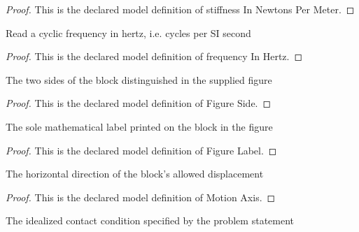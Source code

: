 \begin{proof}
  This is the declared model definition of stiffness In Newtons Per Meter.
\end{proof}
\begin{definition}
  \label{def:physics:phyx-mini-0252:phyxminiproblems-problemphyxmini0252-frequencyinhertz}
  Read a cyclic frequency in hertz, i.e. cycles per SI second
\end{definition}
\begin{proof}
  This is the declared model definition of frequency In Hertz.
\end{proof}
\begin{definition}
  \label{def:physics:phyx-mini-0252:phyxminiproblems-problemphyxmini0252-figureside}
  The two sides of the block distinguished in the supplied figure
\end{definition}
\begin{proof}
  This is the declared model definition of Figure Side.
\end{proof}
\begin{definition}
  \label{def:physics:phyx-mini-0252:phyxminiproblems-problemphyxmini0252-figurelabel}
  The sole mathematical label printed on the block in the figure
\end{definition}
\begin{proof}
  This is the declared model definition of Figure Label.
\end{proof}
\begin{definition}
  \label{def:physics:phyx-mini-0252:phyxminiproblems-problemphyxmini0252-motionaxis}
  The horizontal direction of the block's allowed displacement
\end{definition}
\begin{proof}
  This is the declared model definition of Motion Axis.
\end{proof}
\begin{definition}
  \label{def:physics:phyx-mini-0252:phyxminiproblems-problemphyxmini0252-floorcondition}
  The idealized contact condition specified by the problem statement
\end{definition}
